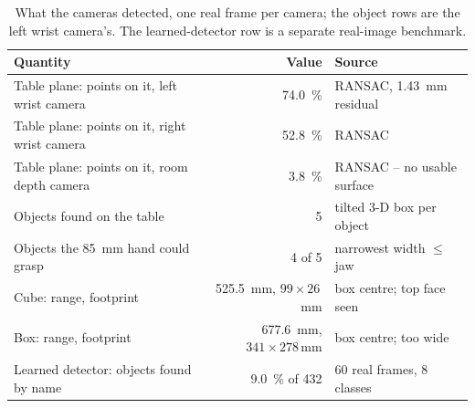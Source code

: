 \begin{table}[htbp]
  \centering
  \small
  \caption[What the cameras detected: measured values]{What the cameras
  detected, one real frame per camera; the object rows are the left wrist
  camera's. The learned-detector row is a separate real-image benchmark.}
  \label{tab:vision-values}
  \begin{tabular}{@{}lrl@{}}
    \toprule
    Quantity & Value & Source \\
    \midrule
    Table plane: points on it, left wrist camera & \SI{74.0}{\percent} & RANSAC, \SI{1.43}{\milli\metre} residual \\
    Table plane: points on it, right wrist camera & \SI{52.8}{\percent} & RANSAC \\
    Table plane: points on it, room depth camera & \SI{3.8}{\percent} & RANSAC -- no usable surface \\
    Objects found on the table & 5 & tilted 3-D box per object \\
    Objects the \SI{85}{\milli\metre} hand could grasp & 4 of 5 & narrowest width $\le$ jaw \\
    Cube: range, footprint & \SI{525.5}{\milli\metre}, $99\times26$\,mm & box centre; top face seen \\
    Box: range, footprint & \SI{677.6}{\milli\metre}, $341\times278$\,mm & box centre; too wide \\
    Learned detector: objects found by name & \SI{9.0}{\percent} of 432 & 60 real frames, 8 classes \\
    \bottomrule
  \end{tabular}
\end{table}
